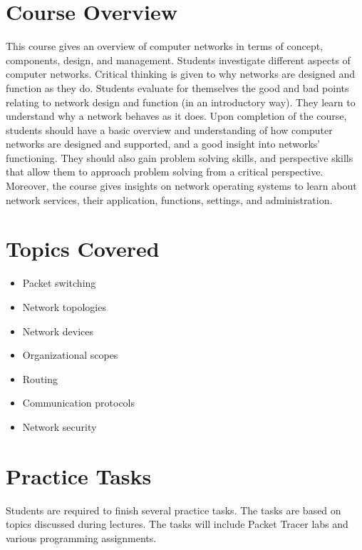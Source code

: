\documentclass[12pt,a4paper,oneside]{article}
\begin{document}
    \section{Course Overview}

This course gives an overview of computer networks in terms of concept, components, design, and management. Students investigate different aspects of computer networks. Critical thinking is given to why networks are designed and function as they do. Students evaluate for themselves the good and bad points relating to network design and function (in an introductory way). They learn to understand why a network behaves as it does. Upon completion of the course, students should have a basic overview and understanding of how computer networks are designed and supported, and a good insight into networks’ functioning. They should also gain problem solving skills, and perspective skills that allow them to approach problem solving from a critical perspective. Moreover, the course gives insights on network operating systems to learn about network services, their application, functions, settings, and administration.

    \section{Topics Covered}

        \begin{itemize}
            \item Packet switching
            \item Network topologies
            \item Network devices
            \item Organizational scopes
            \item Routing
            \item Communication protocols
            \item Network security
        \end{itemize}

    \section{Practice Tasks}

        Students are required to finish several practice tasks. The tasks are based
        on topics discussed during lectures. The tasks will include Packet Tracer labs
        and various programming assignments.
\end{document}
